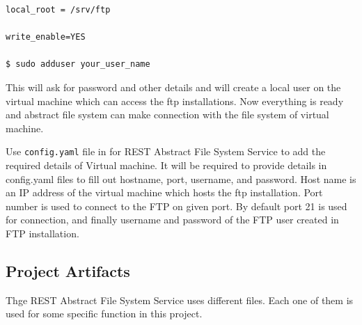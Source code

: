 \begin{verbatim}
local_root = /srv/ftp  

write_enable=YES       

$ sudo adduser your_user_name    
\end{verbatim}

This will ask for password and other details and will create a local
user on the virtual machine which can access the ftp installations.
Now everything is ready and abstract file system can make connection
with the file system of virtual machine.


Use \verb|config.yaml| file in for REST Abstract File System Service
to add the required details of Virtual machine.  It will be required
to provide details in config.yaml files to fill out hostname, port,
username, and password.
Host name is an IP address of the virtual machine which hosts the ftp 
installation. Port number is used to connect to the FTP on given port. By 
default port 21 is used for connection, and finally username and password of 
the FTP user created in FTP installation.


\subsection{Project Artifacts}

Thge REST Abstract File System Service uses different files. 
Each one of them is used for some specific function in this project.

